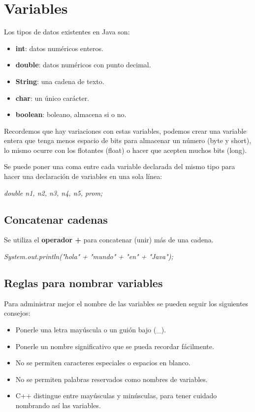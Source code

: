 \section{Variables}
\hspace{0.55cm}Los tipos de datos existentes en Java son:
\begin{itemize}
    \item \textbf{int}: datos numéricos enteros.
    \item \textbf{double}: datos numéricos con punto decimal.
    \item \textbf{String}: una cadena de texto.
    \item \textbf{char}: un único carácter.
    \item \textbf{boolean}: boleano, almacena si o no.
\end{itemize}

Recordemos que hay variaciones con estas variables, podemos crear una variable entera que tenga menos espacio de bits para almacenar un número (byte y short), lo mismo ocurre con los flotantes (float) o hacer que acepten muchos bits (long).

Se puede poner una coma entre cada variable declarada del mismo tipo para hacer una declaración de variables en una sola línea:
\begin{center}
	\textit{double n1, n2, n3, n4, n5, prom;}
\end{center}


\subsection{Concatenar cadenas}
\hspace{0.55cm}Se utiliza el \textbf{operador +} para concatenar (unir) más de una cadena.
\begin{center}
	\textit{System.out.println("hola" + "mundo" + "en" + "Java");}
\end{center}


\subsection{Reglas para nombrar variables}
\hspace{0.55cm}Para administrar mejor el nombre de las variables se pueden seguir los siguientes consejos:
\begin{itemize}
    \item Ponerle una letra mayúscula o un guión bajo (\_).
    \item Ponerle un nombre significativo que se pueda recordar fácilmente.
    \item No se permiten caracteres especiales o espacios en blanco.
    \item No se permiten palabras reservados como nombres de variables.
    \item C++ distingue entre mayúsculas y minúsculas, para tener cuidado nombrando así las variables.
\end{itemize}



